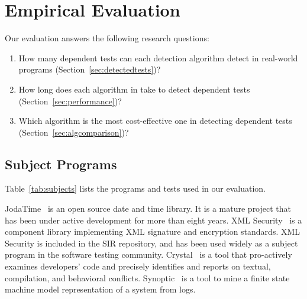 \section{Empirical Evaluation}
\label{sec:evaluation}



\newcommand{\jodatimetests}{3875\xspace}
\newcommand{\xmlsecuritytests}{108\xspace}
\newcommand{\crystaltests}{75\xspace}
\newcommand{\synoptictests}{118\xspace}
\newcommand{\totaltests}{4176\xspace}

\newcommand{\jodatimeautotests}{2639\xspace}
\newcommand{\xmlsecurityautotests}{665\xspace}
\newcommand{\crystalautotests}{3198\xspace}
\newcommand{\synopticautotests}{2467\xspace}
\newcommand{\totalautotests}{8969\xspace}




Our evaluation answers the following research questions:

\vspace{-1mm}

\begin{enumerate}
\item How many dependent tests can each detection
algorithm detect in
real-world programs (Section~\ref{sec:detectedtests})?

\item How long does each algorithm in \ourtool take to detect dependent
tests (Section~\ref{sec:performance})?

\item Which algorithm is the most cost-effective one in detecting
dependent tests (Section~\ref{sec:algcomparison})?
\end{enumerate}

\subsection{Subject Programs}


Table~\ref{tab:subjects} lists the programs and
tests used in our evaluation.

JodaTime~\cite{jodatime} is an open source
date and time library. It is a mature project that
has been under active development
for more than eight years. XML Security~\cite{xmlsecurity}
is a component library implementing XML signature and encryption
standards. XML Security is included in
the SIR repository, and has been used widely
as a subject program in the software testing community.
Crystal~\cite{crystal} is a tool that
pro-actively examines developers' code and
precisely identifies and reports on textual,
compilation, and behavioral conflicts.
Synoptic~\cite{synoptic} is a tool to mine a finite state
machine model representation of a system from logs.

